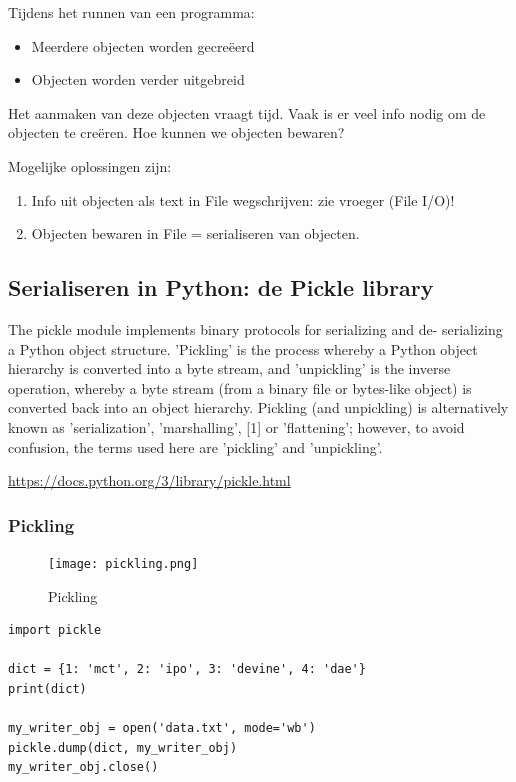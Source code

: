 \documentclass{article}
\begin{document}
Tijdens het runnen van een programma:

\begin{itemize}
    \item Meerdere objecten worden gecreëerd
    \item Objecten worden verder uitgebreid
\end{itemize}

Het aanmaken van deze objecten vraagt tijd. Vaak is er veel info nodig
om de objecten te creëren. Hoe kunnen we objecten bewaren?

Mogelijke oplossingen zijn:

\begin{enumerate}
    \item Info uit objecten als text in File wegschrijven: zie vroeger (File I/O)!
    \item Objecten bewaren in File = serialiseren van objecten.
\end{enumerate}

\subsection{Serialiseren in Python: de Pickle library}

The pickle module implements binary protocols for serializing and de-
serializing a Python object structure. 'Pickling' is the process whereby
a Python object hierarchy is converted into a byte stream, and
'unpickling' is the inverse operation, whereby a byte stream (from a
binary file or bytes-like object) is converted back into an object
hierarchy. Pickling (and unpickling) is alternatively known as
'serialization', 'marshalling', [1] or 'flattening'; however, to avoid
confusion, the terms used here are 'pickling' and 'unpickling'.

\url{https://docs.python.org/3/library/pickle.html}

\subsubsection{Pickling}

\begin{figure}[H]
    \centering
    \texttt{[image: pickling.png]}
    \caption{Pickling}
\end{figure}

\begin{verbatim}
import pickle

dict = {1: 'mct', 2: 'ipo', 3: 'devine', 4: 'dae'}
print(dict)

my_writer_obj = open('data.txt', mode='wb')
pickle.dump(dict, my_writer_obj)
my_writer_obj.close()
\end{verbatim}
\end{document}
